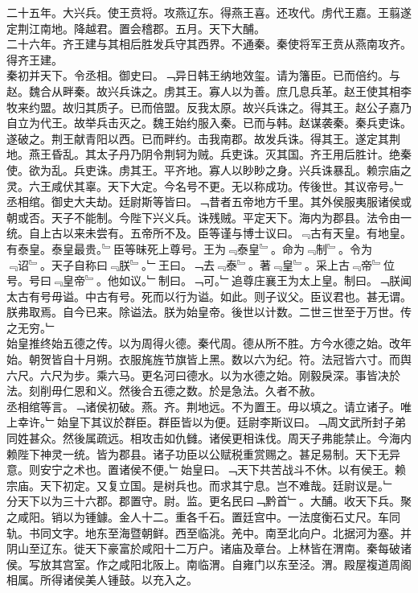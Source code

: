 \documentclass{zhvt-classic}
\begin{document}
\hspace*{2em}二十五年。大兴兵。使王贲将。攻燕辽东。得燕王喜。还攻代。虏代王嘉。王翦遂定荆江南地。降越君。置会稽郡。五月。天下大酺。\\
\hspace*{2em}二十六年。齐王建与其相后胜发兵守其西界。不通秦。秦使将军王贲从燕南攻齐。得齐王建。\\
\hspace*{2em}秦初并天下。令丞相。御史曰。﹁异日韩王纳地效玺。请为籓臣。已而倍约。与赵。魏合从畔秦。故兴兵诛之。虏其王。寡人以为善。庶几息兵革。赵王使其相李牧来约盟。故归其质子。已而倍盟。反我太原。故兴兵诛之。得其王。赵公子嘉乃自立为代王。故举兵击灭之。魏王始约服入秦。已而与韩。赵谋袭秦。秦兵吏诛。遂破之。荆王献青阳以西。已而畔约。击我南郡。故发兵诛。得其王。遂定其荆地。燕王昏乱。其太子丹乃阴令荆轲为贼。兵吏诛。灭其国。齐王用后胜计。绝秦使。欲为乱。兵吏诛。虏其王。平齐地。寡人以眇眇之身。兴兵诛暴乱。赖宗庙之灵。六王咸伏其辜。天下大定。今名号不更。无以称成功。传後世。其议帝号。﹂丞相绾。御史大夫劫。廷尉斯等皆曰。﹁昔者五帝地方千里。其外侯服夷服诸侯或朝或否。天子不能制。今陛下兴义兵。诛残贼。平定天下。海内为郡县。法令由一统。自上古以来未尝有。五帝所不及。臣等谨与博士议曰。﹃古有天皇。有地皇。有泰皇。泰皇最贵。﹄臣等昧死上尊号。王为﹃泰皇﹄。命为﹃制﹄。令为﹃诏﹄。天子自称曰﹃朕﹄。﹂王曰。﹁去﹃泰﹄。著﹃皇﹄。采上古﹃帝﹄位号。号曰﹃皇帝﹄。他如议。﹂制曰。﹁可。﹂追尊庄襄王为太上皇。制曰。﹁朕闻太古有号毋谥。中古有号。死而以行为谥。如此。则子议父。臣议君也。甚无谓。朕弗取焉。自今已来。除谥法。朕为始皇帝。後世以计数。二世三世至于万世。传之无穷。﹂\\
\hspace*{2em}始皇推终始五德之传。以为周得火德。秦代周。德从所不胜。方今水德之始。改年始。朝贺皆自十月朔。衣服旄旌节旗皆上黑。数以六为纪。符。法冠皆六寸。而舆六尺。六尺为步。乘六马。更名河曰德水。以为水德之始。刚毅戾深。事皆决於法。刻削毋仁恩和义。然後合五德之数。於是急法。久者不赦。\\
\hspace*{2em}丞相绾等言。﹁诸侯初破。燕。齐。荆地远。不为置王。毋以填之。请立诸子。唯上幸许。﹂始皇下其议於群臣。群臣皆以为便。廷尉李斯议曰。﹁周文武所封子弟同姓甚众。然後属疏远。相攻击如仇雠。诸侯更相诛伐。周天子弗能禁止。今海内赖陛下神灵一统。皆为郡县。诸子功臣以公赋税重赏赐之。甚足易制。天下无异意。则安宁之术也。置诸侯不便。﹂始皇曰。﹁天下共苦战斗不休。以有侯王。赖宗庙。天下初定。又复立国。是树兵也。而求其宁息。岂不难哉。廷尉议是。﹂\\
\hspace*{2em}分天下以为三十六郡。郡置守。尉。监。更名民曰﹁黔首﹂。大酺。收天下兵。聚之咸阳。销以为锺鐻。金人十二。重各千石。置廷宫中。一法度衡石丈尺。车同轨。书同文字。地东至海暨朝鲜。西至临洮。羌中。南至北向户。北据河为塞。并阴山至辽东。徙天下豪富於咸阳十二万户。诸庙及章台。上林皆在渭南。秦每破诸侯。写放其宫室。作之咸阳北阪上。南临渭。自雍门以东至泾。渭。殿屋複道周阁相属。所得诸侯美人锺鼓。以充入之。\\
\end{document}
